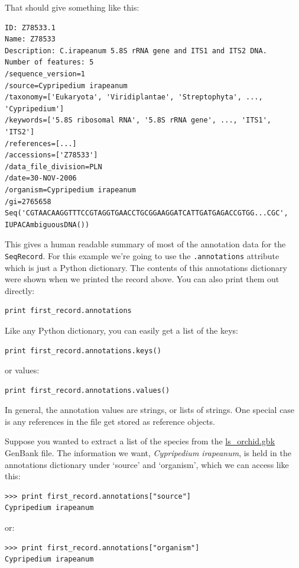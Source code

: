 \documentclass{report}
\begin{document}
\noindent That should give something like this:

\begin{verbatim}
ID: Z78533.1
Name: Z78533
Description: C.irapeanum 5.8S rRNA gene and ITS1 and ITS2 DNA.
Number of features: 5
/sequence_version=1
/source=Cypripedium irapeanum
/taxonomy=['Eukaryota', 'Viridiplantae', 'Streptophyta', ..., 'Cypripedium']
/keywords=['5.8S ribosomal RNA', '5.8S rRNA gene', ..., 'ITS1', 'ITS2']
/references=[...]
/accessions=['Z78533']
/data_file_division=PLN
/date=30-NOV-2006
/organism=Cypripedium irapeanum
/gi=2765658
Seq('CGTAACAAGGTTTCCGTAGGTGAACCTGCGGAAGGATCATTGATGAGACCGTGG...CGC', IUPACAmbiguousDNA())
\end{verbatim}

This gives a human readable summary of most of the annotation data for the \verb|SeqRecord|.
For this example we're going to use the \verb|.annotations| attribute which is just a Python dictionary.
The contents of this annotations dictionary were shown when we printed the record above.
You can also print them out directly:
\begin{verbatim}
print first_record.annotations
\end{verbatim}
\noindent Like any Python dictionary, you can easily get a list of the keys:
\begin{verbatim}
print first_record.annotations.keys()
\end{verbatim}
\noindent or values:
\begin{verbatim}
print first_record.annotations.values()
\end{verbatim}

In general, the annotation values are strings, or lists of strings.  One special case is any references in the file get stored as reference objects.  

Suppose you wanted to extract a list of the species from the \href{http://biopython.org/DIST/docs/tutorial/examples/ls_orchid.gbk}{ls\_orchid.gbk} GenBank file.  The information we want, \emph{Cypripedium irapeanum}, is held in the annotations dictionary under `source' and `organism', which we can access like this:

\begin{verbatim}
>>> print first_record.annotations["source"]
Cypripedium irapeanum
\end{verbatim}

\noindent or:

\begin{verbatim}
>>> print first_record.annotations["organism"]
Cypripedium irapeanum
\end{verbatim}
\end{document}
